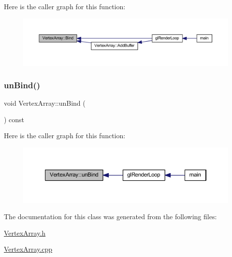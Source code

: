 Here is the caller graph for this function\+:
\nopagebreak
\begin{figure}[H]
\begin{center}
\leavevmode
\includegraphics[width=350pt]{class_vertex_array_ad5059455f0864327028636c628d5a661_icgraph}
\end{center}
\end{figure}
\mbox{\label{class_vertex_array_a70bf6308f19780c3099a8351c29ae4ff}} 
\subsubsection{\texorpdfstring{un\+Bind()}{unBind()}}
{\footnotesize\ttfamily void Vertex\+Array\+::un\+Bind (\begin{DoxyParamCaption}{ }\end{DoxyParamCaption}) const}

Here is the caller graph for this function\+:
\nopagebreak
\begin{figure}[H]
\begin{center}
\leavevmode
\includegraphics[width=350pt]{class_vertex_array_a70bf6308f19780c3099a8351c29ae4ff_icgraph}
\end{center}
\end{figure}


The documentation for this class was generated from the following files\+:\begin{DoxyCompactItemize}
\item 
\mbox{\hyperlink{_vertex_array_8h}{Vertex\+Array.\+h}}\item 
\mbox{\hyperlink{_vertex_array_8cpp}{Vertex\+Array.\+cpp}}\end{DoxyCompactItemize}
